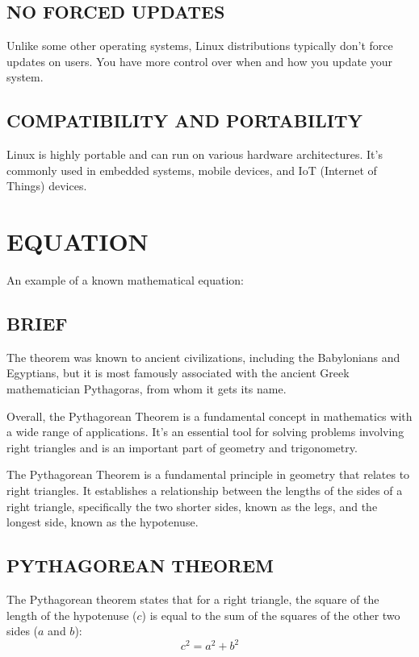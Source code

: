 \documentclass{article}
\begin{document}
\subsection{NO FORCED UPDATES}
Unlike some other operating systems, Linux distributions typically don't force updates on users. You have more control over when and how you update your system.

\subsection{COMPATIBILITY AND PORTABILITY}
Linux is highly portable and can run on various hardware architectures. It's commonly used in embedded systems, mobile devices, and IoT (Internet of Things) devices.


\newpage

\section{EQUATION}
An example of a known  mathematical equation:

\subsection{BRIEF}
The theorem was known to ancient civilizations, including the Babylonians and Egyptians, but it is most famously associated with the ancient Greek mathematician Pythagoras, from whom it gets its name.

Overall, the Pythagorean Theorem is a fundamental concept in mathematics with a wide range of applications. It's an essential tool for solving problems involving right triangles and is an important part of geometry and trigonometry.

The Pythagorean Theorem is a fundamental principle in geometry that relates to right triangles. It establishes a relationship between the lengths of the sides of a right triangle, specifically the two shorter sides, known as the legs, and the longest side, known as the hypotenuse.



\subsection{PYTHAGOREAN THEOREM}
The Pythagorean theorem states that for a right triangle, the square of the length of the hypotenuse ($c$) is equal to the sum of the squares of the other two sides ($a$ and $b$):
\[
c^2 = a^2 + b^2
\]
\end{document}

